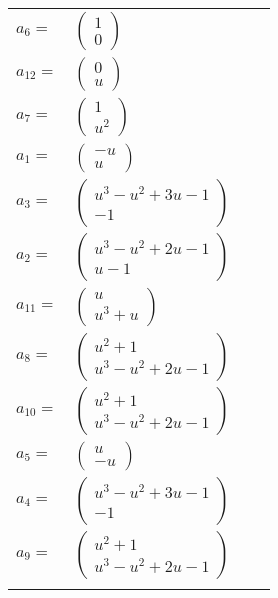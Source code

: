 \documentclass[1p]{elsarticle_modified}
\theoremstyle{definition}
\begin{document}
\begin{tabular}{m{7pt} m{180pt} m{7pt} m{180pt} }
\flushright $a_{6}=$&$\begin{pmatrix}1\\0\end{pmatrix}$ \\
\flushright $a_{12}=$&$\begin{pmatrix}0\\u\end{pmatrix}$ \\
\flushright $a_{7}=$&$\begin{pmatrix}1\\u^2\end{pmatrix}$ \\
\flushright $a_{1}=$&$\begin{pmatrix}- u\\u\end{pmatrix}$ \\
\flushright $a_{3}=$&$\begin{pmatrix}u^3- u^2+3 u-1\\-1\end{pmatrix}$ \\
\flushright $a_{2}=$&$\begin{pmatrix}u^3- u^2+2 u-1\\u-1\end{pmatrix}$ \\
\flushright $a_{11}=$&$\begin{pmatrix}u\\u^3+u\end{pmatrix}$ \\
\flushright $a_{8}=$&$\begin{pmatrix}u^2+1\\u^3- u^2+2 u-1\end{pmatrix}$ \\
\flushright $a_{10}=$&$\begin{pmatrix}u^2+1\\u^3- u^2+2 u-1\end{pmatrix}$ \\
\flushright $a_{5}=$&$\begin{pmatrix}u\\- u\end{pmatrix}$ \\
\flushright $a_{4}=$&$\begin{pmatrix}u^3- u^2+3 u-1\\-1\end{pmatrix}$ \\
\flushright $a_{9}=$&$\begin{pmatrix}u^2+1\\u^3- u^2+2 u-1\end{pmatrix}$\\&\end{tabular}
\end{document}
